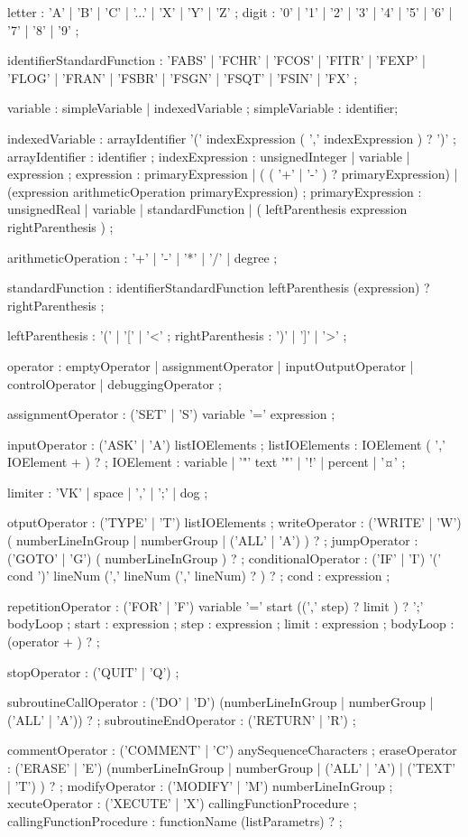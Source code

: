\documentclass{article}
\begin{document}
\begin{rail}

letter : 'A' | 'B' | 'C' | '...' | 'X' | 'Y' | 'Z' ;
digit : '0' | '1' | '2' | '3' | '4' | '5' | '6' | '7' | '8' | '9' ;

identifierStandardFunction : 'FABS' | 'FCHR' | 'FCOS' | 'FITR' | 'FEXP' | 'FLOG' | 'FRAN' | 'FSBR' | 'FSGN' | 'FSQT' | 'FSIN' | 'FX' ;

variable : simpleVariable | indexedVariable ;
simpleVariable : identifier;

indexedVariable : arrayIdentifier '(' indexExpression ( ',' indexExpression ) ? ')' ;
arrayIdentifier : identifier ;
indexExpression : unsignedInteger | variable | expression ;
expression : primaryExpression | ( ( '+' | '-' ) ? primaryExpression) | (expression arithmeticOperation primaryExpression) ;
primaryExpression : unsignedReal | variable | standardFunction | ( leftParenthesis expression rightParenthesis ) ;

arithmeticOperation : '+' | '-' | '*' | '/' | degree ;

standardFunction : identifierStandardFunction leftParenthesis (expression) ? rightParenthesis ;

leftParenthesis : '(' | '[' | '<' ;
rightParenthesis : ')' | ']' | '>' ;

operator : emptyOperator | assignmentOperator | inputOutputOperator | controlOperator | debuggingOperator ;

assignmentOperator : ('SET' | 'S') variable '=' expression ;

inputOperator : ('ASK' | 'A') listIOElements ;
listIOElements : IOElement ( ',' IOElement + ) ? ;
IOElement : variable | '"' text '"' | '!' | percent | '¤' ;

limiter : 'VK' | space | ',' | ';' | dog ;

otputOperator : ('TYPE' | 'T') listIOElements ;
writeOperator : ('WRITE' | 'W') ( numberLineInGroup | numberGroup | ('ALL' | 'A') ) ? ;
jumpOperator :  ('GOTO' | 'G') ( numberLineInGroup ) ? ;
conditionalOperator : ('IF' | 'I') '(' cond ')' lineNum (',' lineNum (',' lineNum) ? ) ? ;
cond : expression ;

repetitionOperator : ('FOR' | 'F') variable '=' start ((',' step) ? limit ) ? ';' bodyLoop ;
start : expression ;
step : expression ;
limit : expression ;
bodyLoop : (operator + ) ? ;

stopOperator : ('QUIT' | 'Q') ;

subroutineCallOperator : ('DO' | 'D') (numberLineInGroup | numberGroup | ('ALL' | 'A')) ? ;
subroutineEndOperator : ('RETURN' | 'R') ;

commentOperator : ('COMMENT' | 'C') anySequenceCharacters ;
eraseOperator : ('ERASE' | 'E') (numberLineInGroup | numberGroup | ('ALL' | 'A') | ('TEXT' | 'T') ) ? ;
modifyOperator : ('MODIFY' | 'M') numberLineInGroup ;
xecuteOperator : ('XECUTE' | 'X') callingFunctionProcedure ;
callingFunctionProcedure : functionName (listParametrs) ? ;

\end{rail}
    
\end{document}

